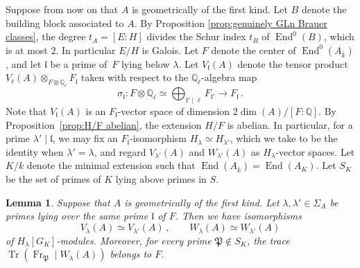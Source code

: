 \documentclass[oneside]{amsart}
\newtheorem{lemma}[theorem]{Lemma}
\theoremstyle{remark}
\newcommand{\Q}{\mathbb Q}
\newcommand{\kbar}{{\bar{k}}}
\newcommand{\End}{\operatorname{End}}
\newcommand{\Frob}{\operatorname{Fr}}
\newcommand{\Tr}{\operatorname{Tr}}
\newcommand{\gl}{\mathfrak{l}}
\newcommand{\Pg}{\mathfrak{P}}
\numberwithin{equation}{section}
\begin{document}
Suppose from now on that $A$ is geometrically of the first kind. Let $B$ denote the building block associated to $A$. By Proposition \ref{prop:genuinely GLn Brauer classes}, the degree $t_A=[E:H]$ divides the Schur index $t_B$ of $\End^0(B)$, which is at most $2$. In particular $E/H$ is Galois. Let $F$ denote the center of $\End^0(A_\kbar)$, and let $\gl$ be a prime of~$F$ lying below $\lambda$. Let $V_\gl(A)$ denote the tensor product $V_\ell(A) \otimes_{F\otimes \Q_\ell} F_\gl$ taken with respect to the $\Q_\ell$-algebra map
$$
\sigma_\gl\colon F \otimes \Q_\ell\simeq \bigoplus_{\gl' \mid \ell} F_{\gl'} \rightarrow F_\gl\,. 
$$
Note that $V_\gl(A)$ is an $F_\gl$-vector space of dimension $2\dim(A)/[F:\Q]$.
By Proposition~\ref{prop:H/F abelian}, the extension $H/F$ is abelian. In particular, for a prime $\lambda '\mid \gl$, we may fix an $F_\gl$-isomorphism $  H_\lambda \simeq H_{\lambda '} $, which we take to be the identity when $\lambda'=\lambda$, and regard $V_{\lambda'}(A)$ and $W_{\lambda'}(A)$ as $H_\lambda$-vector spaces. Let $K/k$ denote the minimal extension such that $\End(A_\kbar)=\End(A_K)$. Let $S_K$ be the set of primes of $K$ lying above primes in $S$.

\begin{lemma}\label{lemma: VlambdaGKmodule}
Suppose that $A$ is geometrically of the first kind. Let $\lambda,\lambda'\in \Sigma_A$ be primes lying over the same prime $\gl$ of $F$. Then we have isomorphisms 
$$
V_\lambda(A)\simeq V_{\lambda'}(A)\,, \qquad W_\lambda(A)\simeq W_{\lambda'}(A)
$$
of $H_\lambda[G_K]$-modules. Moreover, for every prime $\Pg\not\in S_K$, the trace $\Tr(\Frob_\Pg\mid W_\lambda(A))$ belongs to $F$.
\end{lemma}
\end{document}
